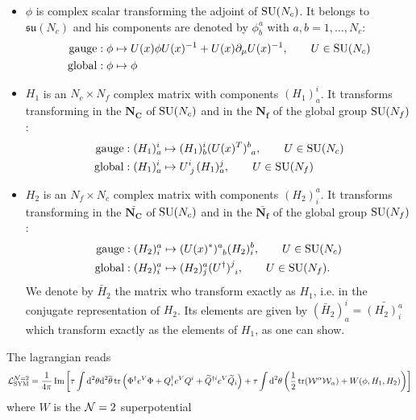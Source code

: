     \begin{itemize}
        \item $\phi$ is complex scalar transforming the adjoint of $\text{SU}(N_c)$. It belongs to $\mathfrak{su}(N_c)$ and his components are denoted by $\phi^a_b$ with $a,b=1,\dots,N_c$:
        \begin{align}
            \text{gauge} &: \phi \mapsto U(x)\phi U(x)^{-1}+U(x)\partial_\mu U(x)^{-1},\qquad U\in\text{SU}(N_c)\\
            \text{global} &: \phi\mapsto \phi
        \end{align}
        \item $H_1$ is an $N_c\times N_f$ complex matrix with components $(H_1)^i_a$. It transforms transforming in the $\boldsymbol{N_C}$ of $\text{SU}(N_c)$ and in the $\boldsymbol{N_f}$ of the global group $\text{SU}(N_f)$:
        \begin{align}
            \text{gauge} &: (H_1)^i_a \mapsto (H_1)^i_b(U(x)^T)\indices{^b_a},\qquad U\in\SU(N_c)\\
            \text{global} &: (H_1)^i_a \mapsto  U\indices{^i_j}(H_1)^j_a,\qquad U\in\SU(N_f)
        \end{align}
        \item $H_2$ is an $N_f\times N_c$ complex matrix with components $(H_2)^a_i$. It transforms transforming in the $\bar{\boldsymbol{N_C}}$ of $\text{SU}(N_c)$ and in the $\bar{\boldsymbol{N_f}}$ of the global group $\text{SU}(N_f)$:
        \begin{align}
            \text{gauge} &: (H_2)^a_i \mapsto (U(x)^*)\indices{^a_b} (H_2)^b_i,\qquad U\in\SU(N_c)\\
            \text{global} &: (H_2)^a_i \mapsto  (H_2)^a_j(U^\dagger)\indices{^j_i},\qquad U\in\SU(N_f).
        \end{align}
        We denote by $\bar{H}_2$ the matrix who transform exactly as $H_1$, i.e. in the conjugate representation of $H_2$. Its elements are given by $(\bar{H}_2)^i_a=\bar{(H_2)^a_i}$ which transform exactly as the elements of $H_1$, as one can show.
    \end{itemize}
    The lagrangian reads
    \begin{equation}
        \mathcal{L}^{\mathcal{N}=2}_{\text{SYM}} = \frac{1}{4\pi}\Im\left[\tau\int\text{d}^2\theta\text{d}^2\overline{\theta}\tr\left(\Phi^\dagger e^V\Phi + Q^\dagger_i e^V Q^i + \widetilde{Q}^{\dagger i}e^V \widetilde{Q}_i\right)+\tau\int\text{d}^2\theta\left(\frac{1}{2}\tr(\mathcal{W}^\alpha\mathcal{W}_\alpha)+W(\phi,H_1,H_2)\right)\right]\label{eq:lag}
    \end{equation}
    where $W$ is the $\mathcal{N}=2$ superpotential
